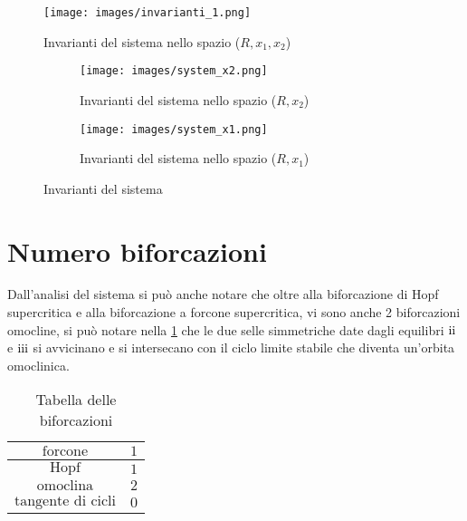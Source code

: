\documentclass{article}
\newcommand{\rom}[1]{\uppercase\expandafter{\romannumeral #1\relax}}
\begin{document}
\begin{figure}
    \centering
    \texttt{[image: images/invarianti\_1.png]}
    \caption{Invarianti del sistema nello spazio (\(R, x_1, x_2\))}
    \label{fig:invarianti}
\end{figure}

\begin{figure}
    \centering
    \begin{subfigure}{0.45\textwidth}
        \texttt{[image: images/system\_x2.png]}
        \caption{Invarianti del sistema nello spazio (\(R, x_2\))}
        \label{fig:sistema_x2}
    \end{subfigure}
    \hfill
    \begin{subfigure}{0.45\textwidth}
        \texttt{[image: images/system\_x1.png]}
        \caption{Invarianti del sistema nello spazio (\(R, x_1\))}
        \label{fig:sistema_x1}
    \end{subfigure}
    \caption{Invarianti del sistema}
    \label{fig:sistema_grafo}
\end{figure}

\newpage

\section{Numero biforcazioni}

Dall'analisi del sistema si può anche notare che oltre alla biforcazione di Hopf supercritica e alla biforcazione a forcone supercritica, vi sono anche 2 biforcazioni omocline, si può notare nella \ref{fig:invarianti} che le due selle simmetriche date dagli equilibri \(\text{\rom{2}}\) e \(\text{\rom{3}}\) si avvicinano e si intersecano con il ciclo limite stabile che diventa un'orbita omoclinica.

\begin{table}[h!]
    \centering
    \begin{tabular}{|c|c|}
        \hline
        $\text{forcone}$           & $1$ \\ \hline
        $\text{Hopf}$              & $1$ \\ \hline
        $\text{omoclina}$          & $2$ \\ \hline
        $\text{tangente di cicli}$ & $0$ \\ \hline
    \end{tabular}
    \caption{Tabella delle biforcazioni}
\end{table}
\end{document}
